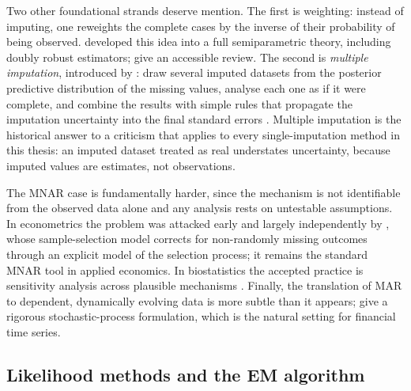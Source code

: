 Two other foundational strands deserve mention. The first is
weighting: instead of imputing, one reweights the complete cases by
the inverse of their probability of being observed.
\citet{robins1994} developed this idea into a full semiparametric
theory, including doubly robust estimators; \citet{seaman2013} give an
accessible review. The second is \emph{multiple imputation},
introduced by \citet{rubin1987}: draw several imputed datasets from
the posterior predictive distribution of the missing values, analyse
each one as if it were complete, and combine the results with simple
rules that propagate the imputation uncertainty into the final
standard errors \citep[see also][]{rubin1996}. Multiple imputation is
the historical answer to a criticism that applies to every
single-imputation method in this thesis: an imputed dataset treated as
real understates uncertainty, because imputed values are estimates,
not observations.

The MNAR case is fundamentally harder, since the mechanism is not
identifiable from the observed data alone and any analysis rests on
untestable assumptions. In econometrics the problem was attacked
early and largely independently by \citet{heckman1979}, whose
sample-selection model corrects for non-randomly missing outcomes
through an explicit model of the selection process; it remains the
standard MNAR tool in applied economics. In biostatistics the
accepted practice is sensitivity analysis across plausible mechanisms
\citep{molenberghs2007}. Finally, the translation of MAR to
dependent, dynamically evolving data is more subtle than it appears;
\citet{mar_stochastic2022} give a rigorous stochastic-process
formulation, which is the natural setting for financial time series.

\subsection{Likelihood methods and the EM algorithm}
\label{sec:lit_em}

